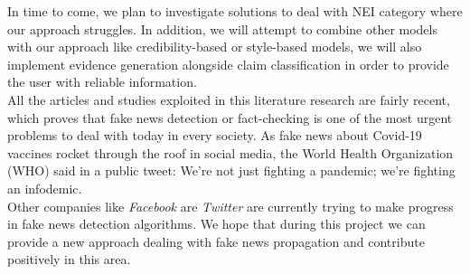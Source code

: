 \documentclass[10pt, english]{report}
\begin{document}
In time to come, we plan to investigate solutions to deal with NEI category where our approach struggles. In addition, we will attempt to combine other models with our approach like credibility-based or style-based models, we will also implement evidence generation alongside claim classification in order to provide the user with reliable information.\\

All the articles and studies exploited in this literature research are fairly recent, which proves that fake news detection or fact-checking is one of the most urgent problems to deal with today in every society. As fake news about Covid-19 vaccines rocket through the roof in social media, the World Health Organization (WHO) said in a public tweet: We’re not just fighting a pandemic;
we’re fighting an infodemic.\\

Other companies like \textit{Facebook} are \textit{Twitter} are currently trying to make progress in fake news detection algorithms. We hope that during this project we can provide a new approach dealing with fake news propagation and contribute positively in this area.




\end{document}
